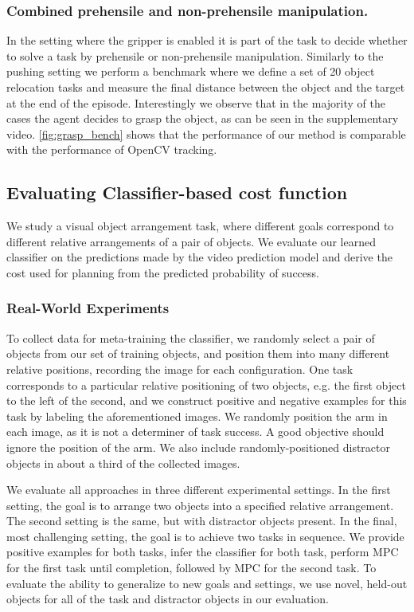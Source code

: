 \subsubsection{Combined prehensile and non-prehensile manipulation.}


In the setting where the gripper is enabled it is part of the task to decide whether to solve a task by prehensile or non-prehensile manipulation. Similarly to the pushing setting we perform a benchmark where we define a set of 20 object relocation tasks and measure the final distance between the object and the target at the end of the episode. Interestingly we observe that in the majority of the cases the agent decides to grasp the object, as can be seen in the supplementary video. \autoref{fig:grasp_bench} shows that the performance of our method is comparable with the performance of OpenCV tracking.




\subsection{Evaluating Classifier-based cost function}

We study a visual object arrangement task, where different goals correspond to different relative arrangements of a pair of objects. We evaluate our learned classifier on the predictions made by the video prediction model and derive the cost used for planning from the predicted probability of success.

\subsubsection{Real-World Experiments}

To collect data for meta-training the classifier, we randomly select a pair of objects from our set of training objects, and position them into many different relative positions, recording the image for each configuration. One task corresponds to a particular relative positioning of two objects, e.g. the first object to the left of the second, and we construct positive and negative examples for this task by labeling the aforementioned images. We randomly position the arm in each image, as it is not a determiner of task success. A good objective should ignore the position of the arm. We also include randomly-positioned distractor objects in about a third of the collected images.

We evaluate all approaches in three different experimental settings. In the first setting, the goal is to arrange two objects into a specified relative arrangement. The second setting is the same, but with distractor objects present. In the final, most challenging setting, the goal is to achieve two tasks in sequence. We provide positive examples for both tasks, infer the classifier for both task, perform MPC for the first task until completion, followed by MPC for the second task. To evaluate the ability to generalize to new goals and settings, we use novel, held-out objects for all of the task and distractor objects in our evaluation. 

